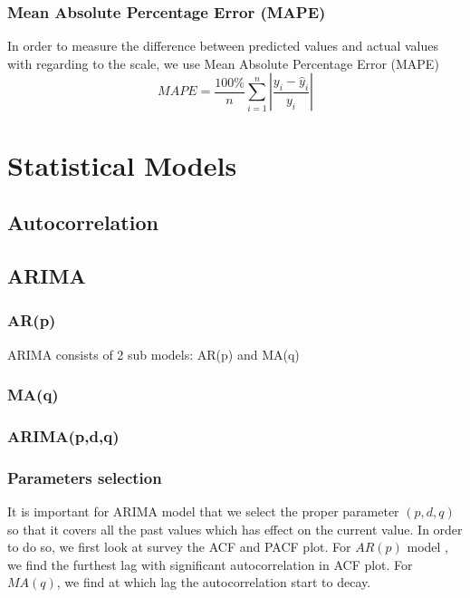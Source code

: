\documentclass[12pt]{article}
\begin{document}
\subsubsection{Mean Absolute Percentage Error (MAPE)}
In order to measure the difference between predicted values and actual values
with regarding to the scale, we use Mean Absolute Percentage Error (MAPE)
$$
MAPE = \frac{100\%}{n}\sum  _{i=1}^{n}\left| \frac{y_i -\hat{y}_i}{y_i} \right|
$$


\section{Statistical Models}
\subsection{Autocorrelation}

\subsection{ARIMA}
\subsubsection{AR(p)}
ARIMA consists of 2 sub models: AR(p) and MA(q)

\subsubsection{MA(q)}

\subsubsection{ARIMA(p,d,q)}

\subsubsection{Parameters selection}
It is important for ARIMA model that we select the proper parameter $(p, d, q)$
so that it covers all the past values which has effect on the current value. In
order to do so, we first look at survey the ACF and PACF plot. For $AR(p)$ model
, we find the furthest lag with significant autocorrelation in ACF plot. For
$MA(q)$, we find at which lag the autocorrelation start to decay.

\end{document}
